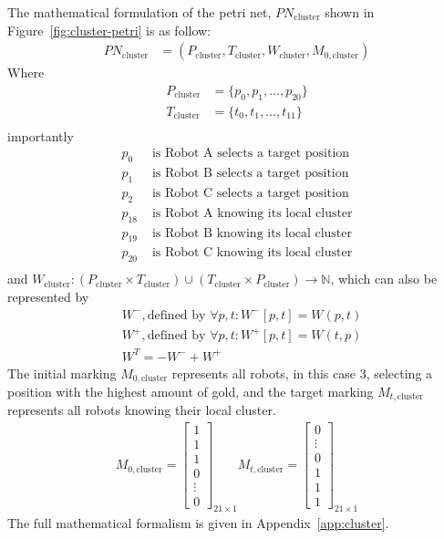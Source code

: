 \documentclass[12pt,a4paper]{article}
\begin{document}
The mathematical formulation of the petri net, $PN_{\text{cluster}}$ shown in Figure~\ref{fig:cluster-petri} is as follow:
\begin{align*}
    PN_{\text{cluster}} &= (P_{\text{cluster}}, T_{\text{cluster}}, W_{\text{cluster}}, M_{0, \text{cluster}})
\end{align*}
Where
\begin{align*}
    P_{\text{cluster}} &= \{p_0, p_1, \ldots, p_{20}\} \\
    T_{\text{cluster}} &= \{t_0, t_1, \ldots, t_{11}\} \\
\end{align*}
importantly
\begin{align*}
    p_0 &\text{ is Robot A selects a target position} \\
    p_1 &\text{ is Robot B selects a target position} \\
    p_2 &\text{ is Robot C selects a target position} \\
    p_{18} &\text{ is Robot A knowing its local cluster} \\
    p_{19} &\text{ is Robot B knowing its local cluster} \\
    p_{20} &\text{ is Robot C knowing its local cluster} \\
\end{align*}
and ${\displaystyle W_{\text{cluster}}:(P_{\text{cluster}}\times T_{\text{cluster}})\cup (T_{\text{cluster}}\times P_{\text{cluster}})\to \mathbb {N} }$, which can also be represented by
\begin{align*}
    &W^{-}, \text{defined by } \forall p,t : W^{-}[p,t] = W(p, t) \\
    &W^{+}, \text{defined by } \forall p,t : W^{+}[p,t] = W(t, p) \\
    &W^{T} = -W^{-} + W^{+}
\end{align*}
The initial marking $M_{0, \text{cluster}}$ represents all robots, in this case 3, selecting a position with the highest amount of gold, and the target marking $M_{t, \text{cluster}}$ represents all robots knowing their local cluster.
\begin{align*}
    M_{0, \text{cluster}} = \begin{bmatrix}
        1 \\ 1 \\ 1 \\ 0 \\ \vdots \\ 0
    \end{bmatrix}_{21 \times 1}
    M_{t, \text{cluster}} = \begin{bmatrix}
        0 \\ \vdots \\ 0 \\ 1 \\ 1 \\ 1
    \end{bmatrix}_{21 \times 1}
\end{align*}
The full mathematical formalism is given in Appendix~\ref{app:cluster}.
\end{document}
